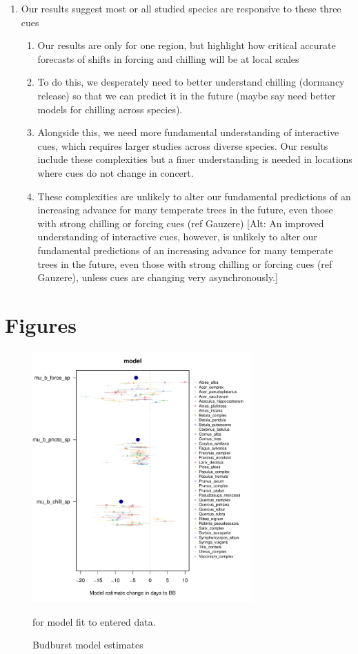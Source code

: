 \documentclass[11pt,letter]{article}
\begin{document}
\begin{enumerate}
\item Our results suggest most or all studied species are responsive to these three cues
\begin{enumerate}
\item Our results are only for one region, but highlight how critical accurate forecasts of shifts in forcing and chilling will be at local scales
\item To do this, we desperately need to better understand chilling (dormancy release) so that we can predict it in the future (maybe say need better models for chilling across species). 
\item Alongside this, we need more fundamental understanding of interactive cues, which requires larger studies across diverse species. Our results include these complexities but a finer understanding is needed in locations where cues do not change in concert.
\item These complexities are unlikely to alter our fundamental predictions of an increasing advance for many temperate trees in the future, even those with strong chilling or forcing cues (ref Gauzere) [Alt: An improved understanding of interactive cues, however, is unlikely to alter our fundamental predictions of an increasing advance for many temperate trees in the future, even those with strong chilling or forcing cues (ref Gauzere), unless cues are changing very asynchronously.]
\end{enumerate}

\end{enumerate}

\section* {Figures}

\newpage

\begin{figure}[h!]
\centering
\noindent \includegraphics[width=0.75\textwidth]{..//..//analyses/bb_analysis/figures/muplotmodelspcomwcrops_expramp_fpz.pdf}
\caption{Budburst model estimates} for model fit to entered data. 
\label{fig:mu}
\end{figure}
\end{document}
